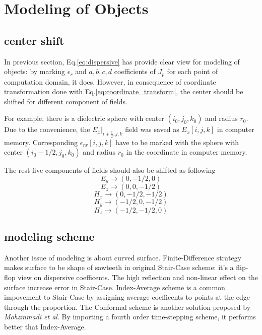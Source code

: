 \section{Modeling of Objects}
\label{sec:modeling}

\subsection{center shift}
In previous section, Eq.\ref{eq:dispersive} has provide clear view for modeling of objects: by marking $\epsilon_r$ and
$a, b, c,d$ coefficients of $J_p$ for each point of computation domain, it does. However, in consequence of coordinate
transformation done with Eq.\ref{eq:coordinate_transform}, the center should be shifted for different component of
fields.

For example, there is a dielectric sphere with center $(i_0,j_0,k_0)$ and radius $r_0$. Due to the convenience, the
$E_x|_{i+\frac{1}{2},j,k}$ field was saved as $E_x[i,j,k]$ in computer memory. Corresponding $\epsilon_{rx}[i,j,k]$ have
to be marked with the sphere with center $(i_0-1/2, j_0, k_0)$ and radius $r_0$ in the coordinate in computer memory.

The rest five components of fields should also be shifted as following
\begin{displaymath}
  E_y \rightarrow (0,-1/2,0)
\end{displaymath}
\begin{displaymath}
  E_z \rightarrow (0,0,-1/2)
\end{displaymath}
\begin{displaymath}
  H_x \rightarrow (0,-1/2,-1/2)
\end{displaymath}
\begin{displaymath}
  H_y \rightarrow (-1/2,0,-1/2)
\end{displaymath}
\begin{displaymath}
  H_z \rightarrow (-1/2,-1/2,0)
\end{displaymath}

\subsection{modeling scheme}
Another issue of modeling is about curved surface. Finite-Difference strategy makes surface to be shape of sawteeth in
original Stair-Case scheme: it's a flip-flop view on dispersive coefficents. The high reflection and non-linear effect
on the surface increase error in Stair-Case. Index-Average scheme is a common impovement to Stair-Case by assigning
average coefficents to points at the edge through the proportion. The Conformal scheme is another solution proposed by
\textit{Mohzmmadi et al}. By importing a fourth order time-stepping scheme, it performs better that Index-Average.


